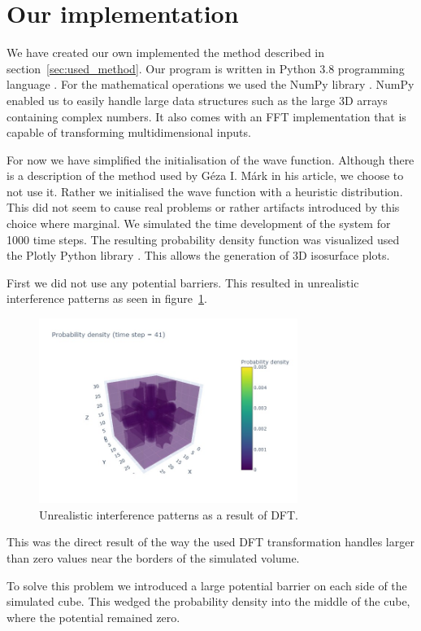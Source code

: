 \section{Our implementation}

We have created our own implemented the method described in section~\ref{sec:used_method}.
Our program is written in Python 3.8 programming language \cite{Python}.
For the mathematical operations we used the NumPy library \cite{NumPy}.
NumPy enabled us to easily handle large data structures such as the large 3D arrays containing complex numbers.
It also comes with an FFT implementation that is capable of transforming multidimensional inputs.

For now we have simplified the initialisation of the wave function.
Although there is a description of the method used by Géza I. Márk in his article, we choose to not use it.
Rather we initialised the wave function with a heuristic distribution.
This did not seem to cause real problems or rather artifacts introduced by this choice where marginal.
We simulated the time development of the system for 1000 time steps.
The resulting probability density function was visualized used the Plotly Python library \cite{Plotly}.
This allows the generation of 3D isosurface plots.

First we did not use any potential barriers.
This resulted in unrealistic interference patterns as seen in figure~\ref{fig:interference}.
\begin{figure}
	\includegraphics[width=0.75\textwidth]{"figures/interference_01.jpeg"}
	\caption{Unrealistic interference patterns as a result of DFT.}
	\label{fig:interference}
\end{figure}
This was the direct result of the way the used DFT transformation handles larger than zero values near the borders of the simulated volume.

To solve this problem we introduced a large potential barrier on each side of the simulated cube.
This wedged the probability density into the middle of the cube, where the potential remained zero.

